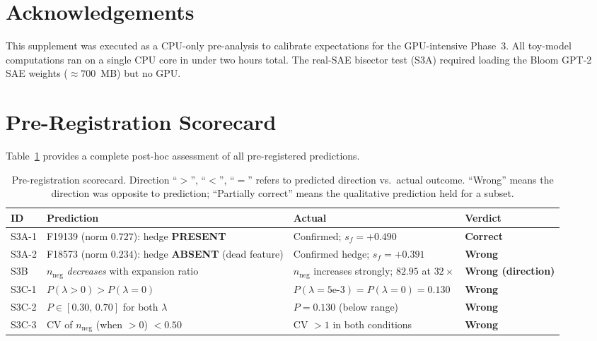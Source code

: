 \documentclass[11pt,a4paper]{article}
\newcommand{\nneg}{n_{\mathrm{neg}}}
\begin{document}
\section*{Acknowledgements}
This supplement was executed as a CPU-only pre-analysis to calibrate expectations
for the GPU-intensive Phase~3.  All toy-model computations ran on a single CPU core
in under two hours total.  The real-SAE bisector test (S3A) required loading the
Bloom GPT-2 SAE weights (${\approx}700$~MB) but no GPU.




\appendix
\section{Pre-Registration Scorecard}
\label{app:scorecard}

Table~\ref{tab:scorecard} provides a complete post-hoc assessment of all
pre-registered predictions.

\begin{table}[H]
\centering
\caption{Pre-registration scorecard.  Direction ``$>$'', ``$<$'', ``$=$'' refers to
predicted direction vs.\ actual outcome.  ``Wrong'' means the direction was opposite
to prediction; ``Partially correct'' means the qualitative prediction held
for a subset.}
\label{tab:scorecard}
\small
\begin{tabular}{@{}p{1.8cm}p{5.5cm}p{3.5cm}p{2.0cm}@{}}
\toprule
ID & Prediction & Actual & Verdict \\
\midrule
S3A-1 & F19139 (norm $0.727$): hedge \textbf{PRESENT} &
  Confirmed; $s_f{=}+0.490$ & \textbf{Correct} \\[4pt]
S3A-2 & F18573 (norm $0.234$): hedge \textbf{ABSENT} (dead feature) &
  Confirmed hedge; $s_f{=}+0.391$ & \textbf{Wrong} \\[4pt]
S3B & $\nneg$ \emph{decreases} with expansion ratio &
  $\nneg$ increases strongly; $82.95$ at $32\times$ & \textbf{Wrong (direction)} \\[4pt]
S3C-1 & $P(\lambda{>}0) > P(\lambda{=}0)$ &
  $P(\lambda{=}5\text{e-}3) = P(\lambda{=}0) = 0.130$ & \textbf{Wrong} \\[4pt]
S3C-2 & $P \in [0.30,\,0.70]$ for both $\lambda$ &
  $P = 0.130$ (below range) & \textbf{Wrong} \\[4pt]
S3C-3 & CV of $\nneg$ (when $>0$) $< 0.50$ &
  CV ${>}1$ in both conditions & \textbf{Wrong} \\
\bottomrule
\end{tabular}
\end{table}
\end{document}
